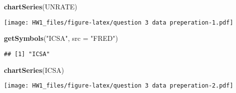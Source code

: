 \documentclass[]{article}
\newenvironment{Shaded}{\begin{snugshade}}{\end{snugshade}}
\newcommand{\KeywordTok}[1]{\textcolor[rgb]{0.13,0.29,0.53}{\textbf{#1}}}
\newcommand{\DataTypeTok}[1]{\textcolor[rgb]{0.13,0.29,0.53}{#1}}
\newcommand{\StringTok}[1]{\textcolor[rgb]{0.31,0.60,0.02}{#1}}
\newcommand{\NormalTok}[1]{#1}
\begin{document}
\begin{Shaded}
\begin{Highlighting}[]
\KeywordTok{chartSeries}\NormalTok{(UNRATE)}
\end{Highlighting}
\end{Shaded}

\texttt{[image: HW1\_files/figure-latex/question 3 data preperation-1.pdf]}

\begin{Shaded}
\begin{Highlighting}[]
\KeywordTok{getSymbols}\NormalTok{(}\StringTok{"ICSA"}\NormalTok{, }\DataTypeTok{src =} \StringTok{"FRED"}\NormalTok{)}
\end{Highlighting}
\end{Shaded}

\begin{verbatim}
## [1] "ICSA"
\end{verbatim}

\begin{Shaded}
\begin{Highlighting}[]
\KeywordTok{chartSeries}\NormalTok{(ICSA)}
\end{Highlighting}
\end{Shaded}

\texttt{[image: HW1\_files/figure-latex/question 3 data preperation-2.pdf]}
\end{document}
